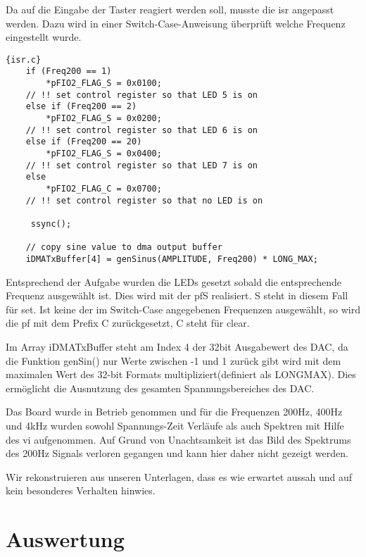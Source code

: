 Da auf die Eingabe der Taster reagiert werden soll, musste die \gls{isr} angepasst werden.
Dazu wird in einer Switch-Case-Anweisung überprüft welche Frequenz eingestellt 
wurde.\par
\begin{adjustbox}{width=\textwidth,height=\textheight,keepaspectratio}
 \begin{lstlisting}[title=isr.c]{isr.c}
    if (Freq200 == 1)
        *pFIO2_FLAG_S = 0x0100;
    // !! set control register so that LED 5 is on
    else if (Freq200 == 2)
        *pFIO2_FLAG_S = 0x0200;
    // !! set control register so that LED 6 is on
    else if (Freq200 == 20)
        *pFIO2_FLAG_S = 0x0400;
    // !! set control register so that LED 7 is on
    else
        *pFIO2_FLAG_C = 0x0700;
    // !! set control register so that no LED is on
    
     ssync();

    // copy sine value to dma output buffer
    iDMATxBuffer[4] = genSinus(AMPLITUDE, Freq200) * LONG_MAX;   
\end{lstlisting}
\end{adjustbox}

Entsprechend der Aufgabe wurden die LEDs gesetzt sobald die entsprechende Frequenz 
ausgewählt ist. Dies wird mit der \gls{pf}\textunderscore S realisiert. \textunderscore S steht in diesem Fall für set.
Ist keine der im Switch-Case angegebenen Frequenzen ausgewählt, so wird die \gls{pf} mit dem Prefix \textunderscore C zurückgesetzt, \textunderscore C steht für clear.

Im Array iDMATxBuffer steht am Index 4 der 32bit Ausgabewert des DAC, 
da die Funktion genSin() nur Werte zwischen -1 und 1 zurück gibt wird mit dem 
maximalen Wert des 32-bit Formats multipliziert(definiert als LONG\textunderscore MAX). 
Dies ermöglicht die Ausnutzung des gesamten Spannungsbereiches des DAC.


Das Board wurde in Betrieb genommen und für die Frequenzen 200Hz, 
400Hz und 4kHz wurden sowohl Spannungs-Zeit Verläufe als auch Spektren mit Hilfe des \gls{vi} aufgenommen. 
Auf Grund von Unachtsamkeit ist das Bild des Spektrums des 200Hz Signals verloren gegangen und kann hier daher nicht gezeigt werden.

Wir rekonstruieren aus unseren Unterlagen, dass es wie erwartet aussah und auf kein besonderes Verhalten hinwies.

\pagebreak
\section{Auswertung}



